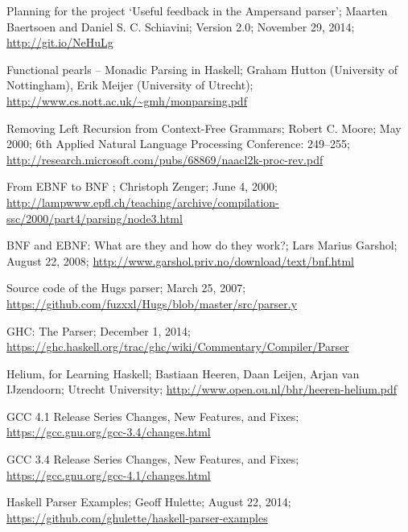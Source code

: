 \label{sec:bibliography}

\begin{thebibliography}{99}
\setlength\columnsep{35pt}
\begin{multicols}{2}
\small

	Planning for the project `Useful feedback in the Ampersand parser';
	Maarten Baertsoen and Daniel S. C. Schiavini;
	Version 2.0;
	November 29, 2014;
	\url{http://git.io/NeHuLg}

	Functional pearls -- Monadic Parsing in Haskell;
	Graham Hutton (University of Nottingham), Erik Meijer (University of Utrecht);
	\url{http://www.cs.nott.ac.uk/~gmh/monparsing.pdf}

	Removing Left Recursion from Context-Free Grammars;
	Robert C. Moore;
	May 2000;
	6th Applied Natural Language Processing Conference: 249–255;
	\url{http://research.microsoft.com/pubs/68869/naacl2k-proc-rev.pdf}

	 From EBNF to BNF ;
	 Christoph Zenger;
	 June 4, 2000;
	 \url{http://lampwww.epfl.ch/teaching/archive/compilation-ssc/2000/part4/parsing/node3.html}

	BNF and EBNF: What are they and how do they work?;
	Lars Marius Garshol;
	August 22, 2008;
	\url{http://www.garshol.priv.no/download/text/bnf.html}

	Source code of the Hugs parser;
	March 25, 2007;
	\url{https://github.com/fuzxxl/Hugs/blob/master/src/parser.y}

	GHC: The Parser;
	December 1, 2014;
	\url{https://ghc.haskell.org/trac/ghc/wiki/Commentary/Compiler/Parser}

	Helium, for Learning Haskell;
	Bastiaan Heeren, Daan Leijen, Arjan van IJzendoorn;
	Utrecht University;
	\url{http://www.open.ou.nl/bhr/heeren-helium.pdf}

	GCC 4.1 Release Series Changes, New Features, and Fixes;
	\url{https://gcc.gnu.org/gcc-3.4/changes.html}

	GCC 3.4 Release Series Changes, New Features, and Fixes;
	\url{https://gcc.gnu.org/gcc-4.1/changes.html}

	Haskell Parser Examples;
	Geoff Hulette;
	August 22, 2014;
	\url{https://github.com/ghulette/haskell-parser-examples}


\end{multicols}
\end{thebibliography}
